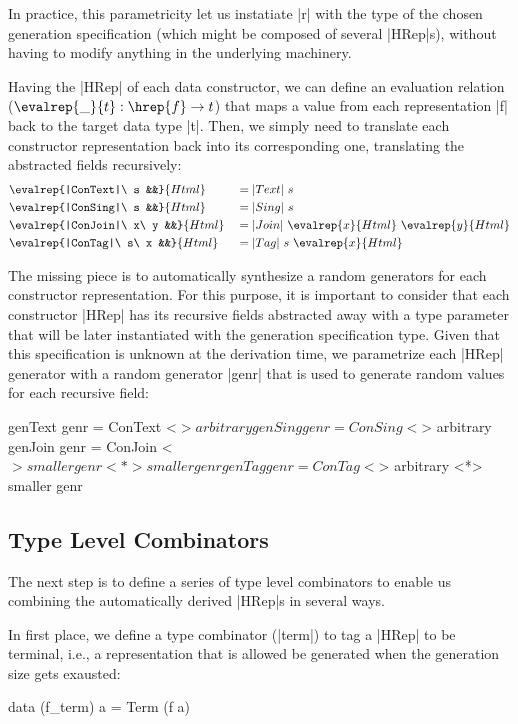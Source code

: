 In practice, this parametricity let us instatiate |r| with the type of the
chosen generation specification (which might be composed of several |HRep|s),
without having to modify anything in the underlying machinery.


Having the |HRep| of each data constructor, we can define an evaluation relation
($\evalrep{\_}{t} : \hrep{f} \rightarrow t$) that maps a value from each
representation |f| back to the target data type |t|.
%
Then, we simply need to translate each constructor representation back into its
corresponding one, translating the abstracted fields recursively:
%
\begin{alignat*}{4}
  &\evalrep{|ConText|\ s &&}{Html}
    &&= |Text|\ s \\
  &\evalrep{|ConSing|\ s &&}{Html}
    &&= |Sing|\ s \\
  &\evalrep{|ConJoin|\ x\ y &&}{Html}
    &&= |Join|\ \evalrep{x}{Html}\ \evalrep{y}{Html} \\
  &\evalrep{|ConTag|\ s\ x &&}{Html}
    &&= |Tag|\ s\ \evalrep{x}{Html}
\end{alignat*}

The missing piece is to automatically synthesize a random generators for each
constructor representation.
%
For this purpose, it is important to consider that each constructor |HRep| has
its recursive fields abstracted away with a type parameter that will be later
instantiated with the generation specification type.
%
Given that this specification is unknown at the derivation time, we parametrize
each |HRep| generator with a random generator |genr| that is used to generate
random values for each recursive field:

\begin{code}
  genText  genr  = ConText  <$> arbitrary
  genSing  genr  = ConSing  <$> arbitrary
  genJoin  genr  = ConJoin  <$> smaller genr <*> smaller genr
  genTag   genr  = ConTag   <$> arbitrary <*> smaller genr
\end{code}


\subsection*{\textbf{Type Level Combinators}}

The next step is to define a series of type level combinators to enable us
combining the automatically derived |HRep|s in several ways.


In first place, we define a type combinator (|term|) to tag a |HRep| to be
terminal, i.e., a representation that is allowed be generated when the
generation size gets exausted:
%
\begin{code}
data (f_term) a = Term (f a)
\end{code}

